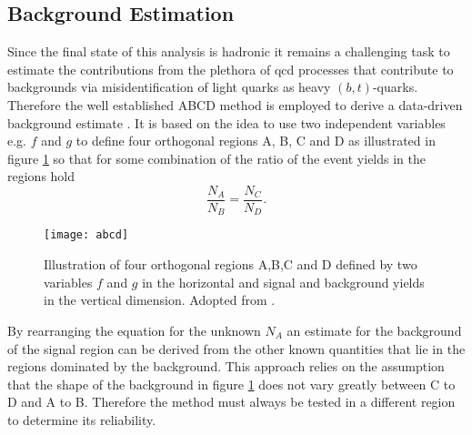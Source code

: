 \subsection{Background Estimation}\label{sec:abcd}
Since the final state of this analysis is hadronic it remains a challenging task to estimate the contributions from the plethora of \ac{qcd} processes that contribute to backgrounds via  misidentification of light quarks as heavy $(b, t)$-quarks. Therefore the well established ABCD method is employed to derive a data-driven background estimate \citep{buttinger2018background,PhysRevD.103.035021}. It is based on the idea to use two independent variables e.g. $f$ and $g$ to define four orthogonal regions A, B, C and D as illustrated in figure \ref{fig:abcd} so that for some combination of the ratio of the event yields in the regions hold
\begin{equation}
    \frac{N_A}{N_B}=\frac{N_C}{N_D}.
\end{equation}
\begin{figure}
    \centering
    \texttt{[image: abcd]}
    \caption[]{Illustration of four orthogonal regions A,B,C and D defined by two variables $f$ and $g$ in the horizontal and signal and background yields in the vertical dimension. Adopted from \citep{PhysRevD.103.035021}.}
    \label{fig:abcd}
\end{figure}
By rearranging the equation for the unknown $N_A$ an estimate for the background of the signal region can be derived from the other known quantities that lie in the regions dominated by the background. This approach relies on the assumption that the shape of the background in figure \ref{fig:abcd} does not vary greatly between C to D and A to B. Therefore the method must always be tested in a different region to determine its reliability.



